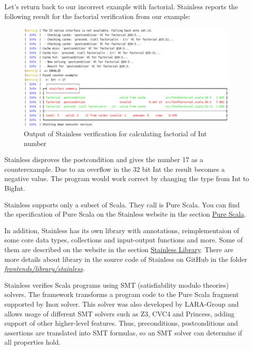 Let's return back to our incorrect example with factorial.
Stainless reports the following result for the factorial verification from our example:
\begin{figure}[H]
	\centering
		\includegraphics[scale=0.5]{images/output1.png}
	\caption{Output of Stainless verification for calculating factorial of Int number}
	\label{fig:output1}
\end{figure}

Stainless disproves the postcondition and gives the number 17 as a counterexample.
Due to an overflow in the 32 bit Int the result becomes a negative value.
The program would work correct by changing the type from Int to BigInt.

Stainless supports only a subset of Scala.
They call is Pure Scala.
You can find the specification of Pure Scala on the Stainless website in the section \href{https://epfl-lara.github.io/stainless/purescala.html}{Pure Scala}.

In addition, Stainless has its own library with annotations, reimplementaion of some core data types, collections and input-output functions and more.
Some of them are described on the website in the section \href{https://epfl-lara.github.io/stainless/library.html}{Stainless Library}.
There are more details about library in the source code of Stainless on GitHub in the folder \href{https://github.com/epfl-lara/stainless}{\textit{frontends/library/stainless}}.

Stainless verifies Scala programs using SMT (satisfiability modulo theories) solvers. 
The framework transforms a program code to the Pure Scala fragment supported by Inox solver.
This solver was also developed by LARA-Group and allows usage of different SMT solvers such as Z3, CVC4 and Princess, adding support of other higher-level features.
Thus, preconditions, postconditions and assertions are translated into SMT formulas, so an SMT solver can determine if all properties hold.\cite{Stainless:introduction}\cite{Stainless}


